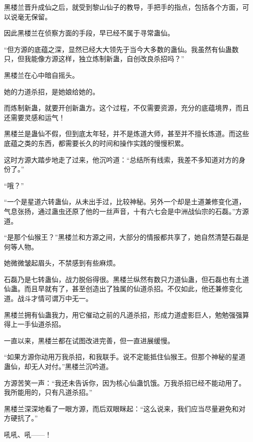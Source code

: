 
\begin{this_body}



黑楼兰晋升成仙之后，就受到黎山仙子的教导，手把手的指点，包括各个方面，可以说毫无保留。

因此黑楼兰在侦察方面的手段，早已经不属于寻常蛊仙。

“但方源的底蕴之深，显然已经大大领先于当今大多数的蛊仙。我虽然有仙蛊数只，但我能像方源这样，独立炼制新蛊，自创改良杀招吗？”

黑楼兰在心中暗自摇头。

她的力道杀招，是她娘给她的。

而炼制新蛊，就要开创新蛊方。这个过程，不仅需要资源，充分的底蕴境界，而且还需要灵感和运气！

黑楼兰是蛊仙不假，但到底太年轻，并不是炼道大师，甚至并不擅长炼道。而这些底蕴之类的东西，都需要长久的时间和操作实践的慢慢积累。

这时方源大踏步地走了过来，他沉吟道：“总结所有线索，我差不多知道对方的身份了。”

“哦？”

“一个是星道六转蛊仙，从未出手过，比较神秘。另外一个却是土道兼修变化道，气息张扬，通过蛊虫还原了他的一丝声音，十有六七会是中洲战仙宗的石磊。”方源道。

“是那个仙猴王？”黑楼兰和方源之间，大部分的情报都共享了，她自然清楚石磊是何等人物。

她微微皱起眉头，不禁感到有些麻烦。

石磊乃是七转蛊仙，战力脱俗得很。黑楼兰纵然有数只力道仙蛊，但石磊也有土道仙蛊。而且早就有了，甚至创造出了独属的仙道杀招。不仅如此，他还兼修变化道。战斗才情可谓万中无一。

黑楼兰拥有仙蛊我力，用它催动之前的凡道杀招，形成力道虚影巨人，勉勉强强算得上一手仙道杀招。

一直以来，黑楼兰都在试图改进完善，但一直进展缓慢。

“如果方源你动用万我杀招，和我联手。说不定能抵住仙猴王。但那个神秘的星道蛊仙，却无人对付。”黑楼兰沉吟道。

方源苦笑一声：“我还未告诉你，因为核心仙蛊饥饿。万我杀招已经不能动用了。我所能用的，只有凡道杀招。”

黑楼兰深深地看了一眼方源，而后双眼眯起：“这么说来，我们应当尽量避免和对方硬抗了。”

吼吼、吼——！


\end{this_body}
